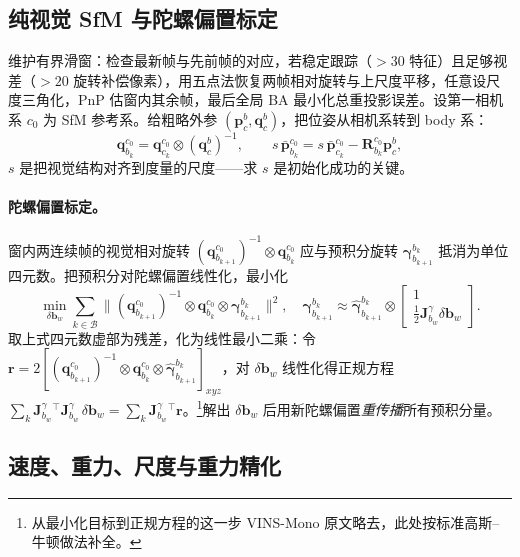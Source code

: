 \subsection{纯视觉 SfM 与陀螺偏置标定}
\label{sec:vio-init-sfm}

维护有界滑窗：检查最新帧与先前帧的对应，若稳定跟踪（$>30$ 特征）且足够视差（$>20$ 旋转补偿像素），用五点法恢复两帧相对旋转与上尺度平移，任意设尺度三角化，PnP 估窗内其余帧，最后全局 BA 最小化总重投影误差。设第一相机系 $c_0$ 为 SfM 参考系。给粗略外参 $(\mathbf{p}^b_c,\mathbf{q}^b_c)$，把位姿从相机系转到 body 系：
\begin{equation}
  \mathbf{q}^{c_0}_{b_k}=\mathbf{q}^{c_0}_{c_k}\otimes(\mathbf{q}^b_c)^{-1},
  \qquad
  s\,\bar{\mathbf{p}}^{c_0}_{b_k}=s\,\bar{\mathbf{p}}^{c_0}_{c_k}-\mathbf{R}^{c_0}_{b_k}\mathbf{p}^b_c,
  \label{eq:vio-init-cam2body}
\end{equation}
$s$ 是把视觉结构对齐到度量的尺度——求 $s$ 是初始化成功的关键。

\paragraph{陀螺偏置标定。}
窗内两连续帧的视觉相对旋转 $(\mathbf{q}^{c_0}_{b_{k+1}})^{-1}\otimes\mathbf{q}^{c_0}_{b_k}$ 应与预积分旋转 $\boldsymbol{\gamma}^{b_k}_{b_{k+1}}$ 抵消为单位四元数。把预积分对陀螺偏置线性化，最小化
\begin{equation}
  \min_{\delta\mathbf{b}_w}\sum_{k\in\mathcal{B}}\big\|(\mathbf{q}^{c_0}_{b_{k+1}})^{-1}\otimes\mathbf{q}^{c_0}_{b_k}\otimes\boldsymbol{\gamma}^{b_k}_{b_{k+1}}\big\|^2,
  \quad
  \boldsymbol{\gamma}^{b_k}_{b_{k+1}}\approx\hat{\boldsymbol{\gamma}}^{b_k}_{b_{k+1}}\otimes\begin{bmatrix}1\\ \tfrac12\mathbf{J}^\gamma_{b_w}\delta\mathbf{b}_w\end{bmatrix}.
  \label{eq:vio-init-gyro}
\end{equation}
取上式四元数虚部为残差，化为线性最小二乘：令 $\mathbf{r}=2[(\mathbf{q}^{c_0}_{b_{k+1}})^{-1}\otimes\mathbf{q}^{c_0}_{b_k}\otimes\hat{\boldsymbol{\gamma}}^{b_k}_{b_{k+1}}]_{xyz}$，对 $\delta\mathbf{b}_w$ 线性化得正规方程 $\sum_k\mathbf{J}^\gamma_{b_w}{}^\top\mathbf{J}^\gamma_{b_w}\,\delta\mathbf{b}_w=\sum_k\mathbf{J}^\gamma_{b_w}{}^\top\mathbf{r}$。\footnote{从最小化目标到正规方程的这一步 VINS-Mono 原文略去，此处按标准高斯--牛顿做法补全。}\;解出 $\delta\mathbf{b}_w$ 后用新陀螺偏置\emph{重传播}所有预积分量。

\subsection{速度、重力、尺度与重力精化}
\label{sec:vio-init-vgs}

